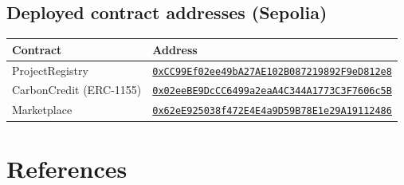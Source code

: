 \documentclass[11pt,a4paper]{article}
\begin{document}
\subsection*{Deployed contract addresses (Sepolia)}
\begin{table}[H]
\centering
\small
\begin{tabularx}{\linewidth}{lX}
\toprule
\textbf{Contract} & \textbf{Address} \\
\midrule
ProjectRegistry          & \href{https://sepolia.etherscan.io/address/0xCC99Ef02ee49bA27AE102B087219892F9eD812e8\#code}{\texttt{0xCC99Ef02ee49bA27AE102B087219892F9eD812e8}} \\
CarbonCredit (ERC-1155)  & \href{https://sepolia.etherscan.io/address/0x02eeBE9DcCC6499a2eaA4C344A1773C3F7606c5B\#code}{\texttt{0x02eeBE9DcCC6499a2eaA4C344A1773C3F7606c5B}} \\
Marketplace              & \href{https://sepolia.etherscan.io/address/0x62eE925038f472E4E4a9D59B78E1e29A19112486\#code}{\texttt{0x62eE925038f472E4E4a9D59B78E1e29A19112486}} \\
\bottomrule
\end{tabularx}
\end{table}

\section*{References}
\end{document}
